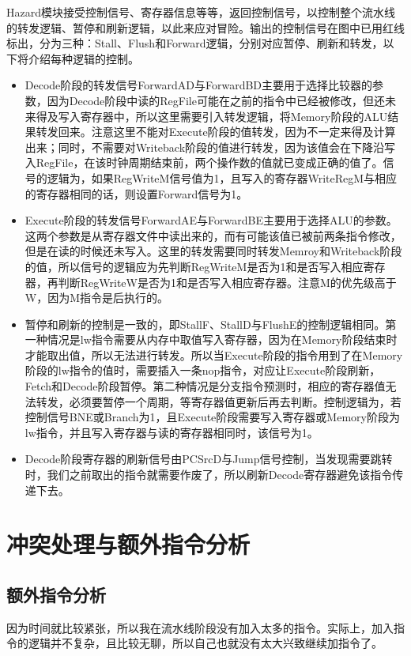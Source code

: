 \documentclass[12pt]{article} %
\begin{document}
\begin{sloppypar}
Hazard模块接受控制信号、寄存器信息等等，返回控制信号，以控制整个流水线的转发逻辑、暂停和刷新逻辑，以此来应对冒险。输出的控制信号在图中已用红线标出，分为三种：Stall、Flush和Forward逻辑，分别对应暂停、刷新和转发，以下将介绍每种逻辑的控制。
\begin{itemize}
\item Decode阶段的转发信号ForwardAD与ForwardBD主要用于选择比较器的参数，因为Decode阶段中读的RegFile可能在之前的指令中已经被修改，但还未来得及写入寄存器中，所以这里需要引入转发逻辑，将Memory阶段的ALU结果转发回来。注意这里不能对Execute阶段的值转发，因为不一定来得及计算出来；同时，不需要对Writeback阶段的值进行转发，因为该值会在下降沿写入RegFile，在该时钟周期结束前，两个操作数的值就已变成正确的值了。信号的逻辑为，如果RegWriteM信号值为1，且写入的寄存器WriteRegM与相应的寄存器相同的话，则设置Forward信号为1。
\item Execute阶段的转发信号ForwardAE与ForwardBE主要用于选择ALU的参数。这两个参数是从寄存器文件中读出来的，而有可能该值已被前两条指令修改，但是在读的时候还未写入。这里的转发需要同时转发Memroy和Writeback阶段的值，所以信号的逻辑应为先判断RegWriteM是否为1和是否写入相应寄存器，再判断RegWriteW是否为1和是否写入相应寄存器。注意M的优先级高于W，因为M指令是后执行的。
\item 暂停和刷新的控制是一致的，即StallF、StallD与FlushE的控制逻辑相同。第一种情况是lw指令需要从内存中取值写入寄存器，因为在Memory阶段结束时才能取出值，所以无法进行转发。所以当Execute阶段的指令用到了在Memory阶段的lw指令的值时，需要插入一条nop指令，对应让Execute阶段刷新，Fetch和Decode阶段暂停。第二种情况是分支指令预测时，相应的寄存器值无法转发，必须要暂停一个周期，等寄存器值更新后再去判断。控制逻辑为，若控制信号BNE或Branch为1，且Execute阶段需要写入寄存器或Memory阶段为lw指令，并且写入寄存器与读的寄存器相同时，该信号为1。
\item Decode阶段寄存器的刷新信号由PCSrcD与Jump信号控制，当发现需要跳转时，我们之前取出的指令就需要作废了，所以刷新Decode寄存器避免该指令传递下去。
\end{itemize}


\newpage
\section{冲突处理与额外指令分析}

\subsection{额外指令分析}

因为时间就比较紧张，所以我在流水线阶段没有加入太多的指令。实际上，加入指令的逻辑并不复杂，且比较无聊，所以自己也就没有太大兴致继续加指令了。


\end{sloppypar}
\end{document}

